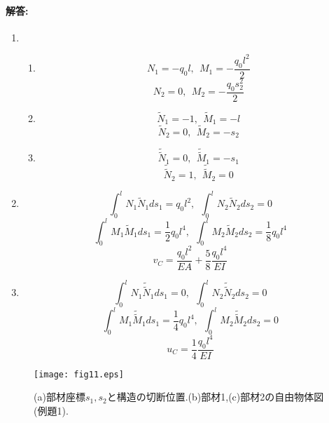 \documentclass[10pt,a4j]{jarticle}
\begin{document}
\paragraph{解答:}
\begin{enumerate}
\item
	\begin{enumerate}
	\item
		\begin{equation}
		N_1=-q_0l, \ \ M_1=-\frac{q_0l^2}{2}
		\label{eqn:}
		\end{equation}
		\begin{equation}
		N_2=0, \ \ M_2=-\frac{q_0s_2^2}{2}
		\label{eqn:}
		\end{equation}
	\item
		\begin{equation}
		\tilde N_1=-1, \ \ \tilde M_1=-l
		\label{eqn:}
		\end{equation}
		\begin{equation}
		\tilde N_2=0, \ \ \tilde M_2=-s_2
		\label{eqn:}
		\end{equation}
	\item
		\begin{equation}
			\tilde{\tilde N}_1=0, \ \ \tilde{\tilde M}_1=-s_1
		\label{eqn:}
		\end{equation}
		\begin{equation}
			\tilde{\tilde N}_2=1, \ \ \tilde{\tilde M}_2=0
		\label{eqn:}
		\end{equation}
	\end{enumerate}
\item
	\begin{equation}
		\int_0^l N_1\tilde N_1ds_1=q_0l^2, \ \ 
		\int_0^l N_2\tilde N_2ds_2=0
		\label{eqn:}
	\end{equation}
	\begin{equation}
		\int_0^l M_1\tilde M_1ds_1=\frac{1}{2}q_0l^4, \ \ 
		\int_0^l M_2\tilde M_2ds_2=\frac{1}{8}q_0l^4
		\label{eqn:}
	\end{equation}
	\begin{equation}
		v_C=
		\frac{q_0l^2}{EA}+ \frac{5}{8}\frac{q_0l^4}{EI}
		\label{eqn:}
	\end{equation}
\item
	\begin{equation}
		\int_0^l N_1\tilde{\tilde N}_1ds_1=0, \ \ 
		\int_0^l N_2\tilde{\tilde N}_2ds_2=0
		\label{eqn:}
	\end{equation}
	\begin{equation}
		\int_0^l M_1\tilde{\tilde M}_1ds_1=\frac{1}{4}q_0l^4, \ \ 
		\int_0^l M_2\tilde{\tilde M}_2ds_2=0
		\label{eqn:}
	\end{equation}
	\begin{equation}
		u_C=
		\frac{1}{4}\frac{q_0l^4}{EI}
		\label{eqn:}
	\end{equation}
\end{enumerate}
\begin{figure}[h]
	\begin{center}
	\texttt{[image: fig11.eps]} 
	\end{center}
	\caption{(a)部材座標$s_1,s_2$と構造の切断位置.(b)部材1,(c)部材2の自由物体図(例題1).} 
	\label{fig:fig11}
\end{figure}
\end{document}
